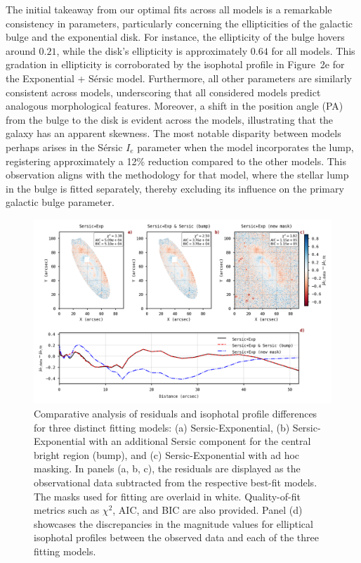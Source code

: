 The initial takeaway from our optimal fits across all models is a remarkable consistency in parameters, particularly concerning the ellipticities of the galactic bulge and the exponential disk. For instance, the ellipticity of the bulge hovers around \(0.21\), while the disk's ellipticity is approximately \(0.64\) for all models. This gradation in ellipticity is corroborated by the isophotal profile in Figure~2e for the Exponential + S\'{e}rsic model. Furthermore, all other parameters are similarly consistent across models, underscoring that all considered models predict analogous morphological features. Moreover, a shift in the position angle (PA) from the bulge to the disk is evident across the models, illustrating that the galaxy has an apparent skewness. The most notable disparity between models perhaps arises in the S\'{e}rsic \(I_{e}\) parameter when the model incorporates the lump, registering approximately a 12\% reduction compared to the other models. This observation aligns with the methodology for that model, where the stellar lump in the bulge is fitted separately, thereby excluding its influence on the primary galactic bulge parameter.

\begin{figure}[h!]
  \centering
  \includegraphics[width=\textwidth]{images/residual_comparison.png}
\caption{\small Comparative analysis of residuals and isophotal profile differences for three distinct fitting models: (a) Sersic-Exponential, (b) Sersic-Exponential with an additional Sersic component for the central bright region (bump), and (c) Sersic-Exponential with ad hoc masking. In panels (a, b, c), the residuals are displayed as the observational data subtracted from the respective best-fit models. The masks used for fitting are overlaid in white. Quality-of-fit metrics such as $\chi^2$, AIC, and BIC are also provided. Panel (d) showcases the discrepancies in the magnitude values for elliptical isophotal profiles between the observed data and each of the three fitting models.}
  \label{fig:3}
\end{figure}

